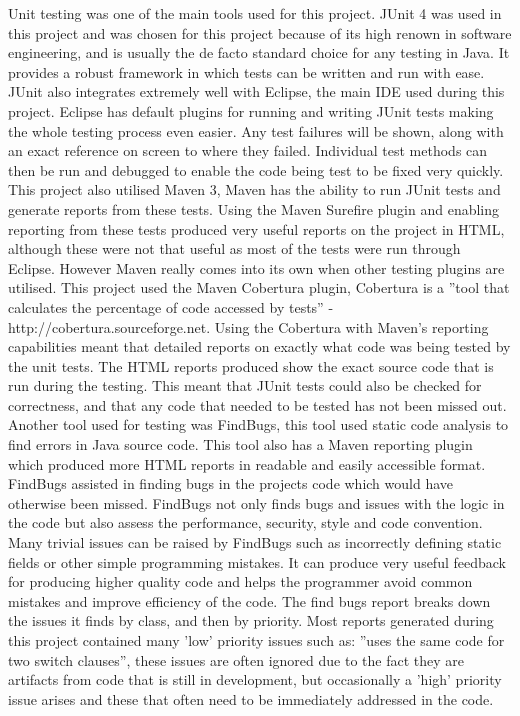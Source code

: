 \documentclass[12pt]{article}
\begin{document}
Unit testing was one of the main tools used for this project. JUnit 4 was used in this project and was chosen for this project because
of its high renown in software engineering, and is usually the de facto standard choice for any testing in Java. It provides a robust framework
in which tests can be written and run with ease. JUnit also integrates extremely well with Eclipse, the main IDE used during this project. Eclipse has default plugins for running and writing JUnit tests making the whole testing process even easier. Any test
failures will be shown, along with an exact reference on screen to where they failed. Individual test methods can then be run and
debugged to enable the code being test to be fixed very quickly.
This project also utilised Maven 3, Maven has the ability to run JUnit tests and generate reports from these tests. Using the Maven
Surefire plugin and enabling reporting from these tests produced very useful reports on the project in HTML, although these were not
that useful as most of the tests were run through Eclipse. However Maven really comes into its own when other testing plugins are
utilised. This project used the Maven Cobertura plugin, Cobertura is a ''tool that calculates the percentage of code accessed by 
tests'' - http://cobertura.sourceforge.net. Using the Cobertura with Maven's reporting capabilities meant that detailed reports
on exactly what code was being tested by the unit tests. The HTML reports produced show the exact source code that is run during the
testing. This meant that JUnit tests could also be checked for correctness, and that any code that needed to be tested has not been
missed out.
Another tool used for testing was FindBugs, this tool used static code analysis to find errors in Java source code. This tool also
has a Maven reporting plugin which produced more HTML reports in readable and easily accessible format. FindBugs assisted in finding bugs in the projects code which would have otherwise been missed. FindBugs not only finds bugs and issues with the logic in the code
but also assess the performance, security, style and code convention. Many trivial issues can be raised by FindBugs such as 
incorrectly defining static fields or other simple programming mistakes. It can produce very useful feedback for producing
higher quality code and helps the programmer avoid common mistakes and improve efficiency of the code. The find bugs report breaks
down the issues it finds by class, and then by priority. Most reports generated during this project contained many 'low' priority
issues such as: ''uses the same code for two switch clauses'', these issues are often ignored due to the fact they are artifacts
from code that is still in development, but occasionally a 'high' priority issue arises and these that often need to be immediately
addressed in the code. 
\end{document}

